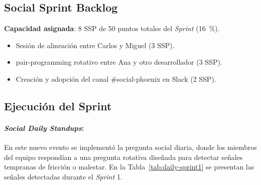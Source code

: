 \subsection{Social Sprint Backlog}

\textbf{Capacidad asignada}: 8 SSP de 50 puntos totales del \textit{Sprint} (16~\%).

\begin{itemize}
    \item Sesión de alineación entre Carlos y Miguel (3 SSP).
    \item \gls{pair-programming} rotativo entre Ana y otro desarrollador (3 SSP).
    \item Creación y adopción del canal \#social-phoenix en Slack (2 SSP).
\end{itemize}

\subsection{Ejecución del Sprint}

\paragraph{\textit{Social Daily Standups}:}

En este nuevo evento se implementó la pregunta social diaria, donde los miembros del equipo respondían a una pregunta rotativa diseñada para detectar señales tempranas de fricción o malestar. En la Tabla~\ref{tab:daily-sprint1} se presentan las señales detectadas durante el \textit{Sprint} 1.

\begingroup
\scriptsize
\renewcommand{\arraystretch}{1.4}
\setlength{\tabcolsep}{4pt}
\setlength{\LTleft}{0pt}
\setlength{\LTright}{0pt}

